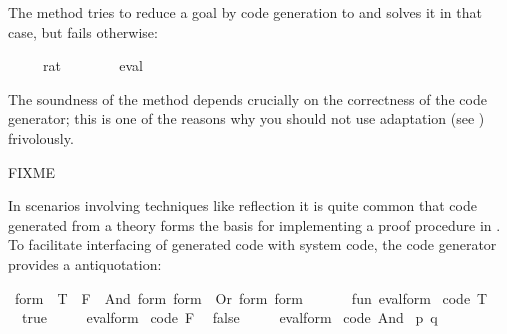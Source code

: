 \begin{isabellebody}
\begin{isamarkuptext}
  The \hyperlink{method.eval}{\mbox{}} method tries to reduce a goal by code generation to 
  and solves it in that case, but fails otherwise:%
\end{isamarkuptext}%
\isamarkuptrue%
%
\isadelimquote
%
\endisadelimquote
%
\isatagquote
{}\isamarkupfalse%
\ {\isachardoublequoteopen}{}{}\ {\isacharslash}\ {\isacharparenleft}{}{}\ {\isacharcolon}{\isacharcolon}\ rat{\isacharparenright}\ {\isacharequal}\ {}\ {\isacharslash}\ {}{\isachardoublequoteclose}\isanewline
\ \ \isamarkupfalse%
\ eval%
\endisatagquote
{\isafoldquote}%
%
\isadelimquote
%
\endisadelimquote
%
\begin{isamarkuptext}%
\noindent The soundness of the \hyperlink{method.eval}{\mbox{}} method depends crucially 
  on the correctness of the code generator;  this is one of the reasons
  why you should not use adaptation (see ) frivolously.%
\end{isamarkuptext}%
\isamarkuptrue%
%
\isamarkuptrue%
%
\begin{isamarkuptext}%
FIXME%
\end{isamarkuptext}%
\isamarkuptrue%
%
\isamarkuptrue%
%
\begin{isamarkuptext}%
In scenarios involving techniques like reflection it is quite common
  that code generated from a theory forms the basis for implementing
  a proof procedure in .  To facilitate interfacing of generated code
  with system code, the code generator provides a  antiquotation:%
\end{isamarkuptext}%
\isamarkuptrue%
%
\isadelimquote
%
\endisadelimquote
%
\isatagquote
{}\isamarkupfalse%
\ form\ {\isacharequal}\ T\ {\isacharbar}\ F\ {\isacharbar}\ And\ form\ form\ {\isacharbar}\ Or\ form\ form\ %
\endisatagquote
{\isafoldquote}%
%
\isadelimquote
%
\endisadelimquote
%
\isadelimquotett
\ %
\endisadelimquotett
%
\isatagquotett
{}\isamarkupfalse%
\ {\isacharverbatimopen}\isanewline
\ \ fun\ eval{\isacharunderscore}form\ %
\isaantiq
code\ T%
\endisaantiq
\ {\isacharequal}\ true\isanewline
\ \ \ \ {\isacharbar}\ eval{\isacharunderscore}form\ %
\isaantiq
code\ F%
\endisaantiq
\ {\isacharequal}\ false\isanewline
\ \ \ \ {\isacharbar}\ eval{\isacharunderscore}form\ {\isacharparenleft}%
\isaantiq
code\ And%
\endisaantiq
\ {\isacharparenleft}p{\isacharcomma}\ q{\isacharparenright}{\isacharparenright}\ {\isacharequal}\isanewline

\end{isabellebody}
